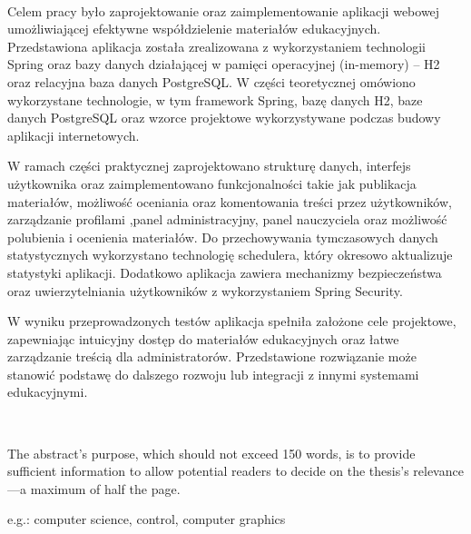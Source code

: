 %


\begin{center}
\\[1cm] 
\end{center}
Celem pracy było zaprojektowanie oraz zaimplementowanie aplikacji webowej umożliwiającej efektywne współdzielenie materiałów edukacyjnych. Przedstawiona aplikacja została zrealizowana z wykorzystaniem technologii Spring oraz bazy danych działającej w pamięci operacyjnej (in-memory) – H2 oraz relacyjna baza danych PostgreSQL. W części teoretycznej omówiono wykorzystane technologie, w tym framework Spring, bazę danych H2, baze danych PostgreSQL oraz wzorce projektowe wykorzystywane podczas budowy aplikacji internetowych.

W ramach części praktycznej zaprojektowano strukturę danych, interfejs użytkownika oraz zaimplementowano funkcjonalności takie jak publikacja materiałów, możliwość oceniania oraz komentowania treści przez użytkowników, zarządzanie profilami ,panel administracyjny, panel nauczyciela oraz możliwość polubienia i ocenienia materiałów. Do przechowywania tymczasowych danych statystycznych wykorzystano technologię schedulera, który okresowo aktualizuje statystyki aplikacji. Dodatkowo aplikacja zawiera mechanizmy bezpieczeństwa oraz uwierzytelniania użytkowników z wykorzystaniem Spring Security.

W wyniku przeprowadzonych testów aplikacja spełniła założone cele projektowe, zapewniając intuicyjny dostęp do materiałów edukacyjnych oraz łatwe zarządzanie treścią dla administratorów. Przedstawione rozwiązanie może stanowić podstawę do dalszego rozwoju lub integracji z innymi systemami edukacyjnymi.

\vfill

\begin{center}
\\[1cm] 
\end{center}
The abstract's purpose, which should not exceed 150 words, is to provide sufficient information to allow potential readers to decide on the thesis's relevance—a maximum of half the page.

\vspace{10pt}
 e.g.: computer science, control, computer graphics